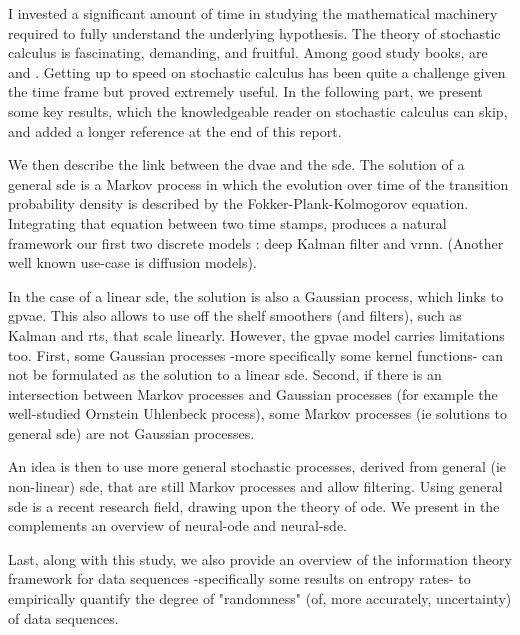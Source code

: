I invested a significant amount of time in studying the mathematical machinery required to fully understand the underlying hypothesis. 
The theory of stochastic calculus is fascinating, demanding, and fruitful.
Among good study books, are \cite{mouvement-brownien-calcul-ito} and \cite{sarkka_applied_2019}. 
Getting up to speed on stochastic calculus has been quite a challenge given the time frame but proved extremely useful. 
In the following part, we present some key results, which the knowledgeable reader on stochastic calculus can skip, 
and added a longer reference at the end of this report. 

We then describe the link between the \gls{dvae} and the \gls{sde}. The solution of a general \gls{sde} is a Markov process 
in which the evolution over time of the transition probability density is described by the Fokker-Plank-Kolmogorov equation. 
Integrating that equation between two time stamps, produces a natural framework our first two discrete models : deep Kalman filter and \gls{vrnn}.
(Another well known  use-case is diffusion models). 

In the case of a linear \gls{sde}, the solution is also a Gaussian process, which links to \gls{gpvae}. 
This also allows to use off the shelf smoothers (and filters), such as Kalman and \gls{rts}, that scale linearly.
However, the \gls{gpvae} model carries limitations too. First, some Gaussian processes -more specifically some kernel functions- can not be formulated as the solution to a linear \gls{sde}.
Second, if there is an intersection between Markov processes and Gaussian processes (for example the well-studied Ornstein Uhlenbeck process), some Markov processes 
(ie solutions to general \gls{sde}) are not Gaussian processes.

An idea is then to use more general stochastic processes, derived from general (ie non-linear) \gls{sde}, that are still 
Markov processes and allow filtering. Using general \gls{sde} is a recent research field, drawing upon the theory of \gls{ode}.
We present in the complements an overview of \gls{neural-ode} and \gls{neural-sde}.

Last, along with this study, we also provide an overview of the information theory framework for data sequences -specifically some results on entropy rates-
 to empirically  quantify the degree of "randomness" (of, more accurately, uncertainty) of data sequences.